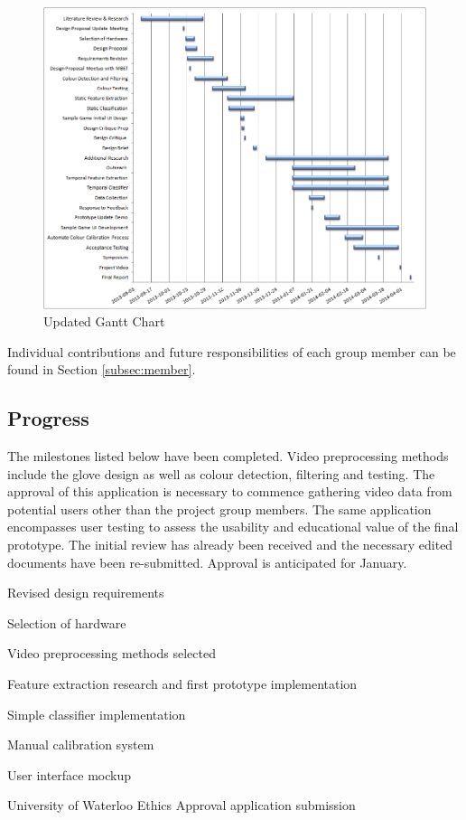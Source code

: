 \documentclass[12pt]{article}
\begin{document}
\begin{figure}[h!]
  \centering
  \includegraphics[scale=1]{Gantt.png}
  \caption{Updated Gantt Chart}
  \label{fig:gantt}
\end{figure}

Individual contributions and future responsibilities of each group member can be found in Section \ref{subsec:member}.

\subsection{Progress}
The milestones listed below have been completed. Video preprocessing methods include the glove design as well as colour detection, filtering and testing. The approval of this application is necessary to commence gathering video data from potential users other than the project group members. The same application encompasses user testing to assess the usability and educational value of the final prototype. The initial review has already been received and the necessary edited documents have been re-submitted. Approval is anticipated for January.

\begin{enumerate*}
  \item Revised design requirements
  \item Selection of hardware
  \item Video preprocessing methods selected
  \item Feature extraction research and first prototype implementation
  \item Simple classifier implementation
  \item Manual calibration system
  \item User interface mockup
  \item University of Waterloo Ethics Approval application submission
\end{enumerate*}
\end{document}
